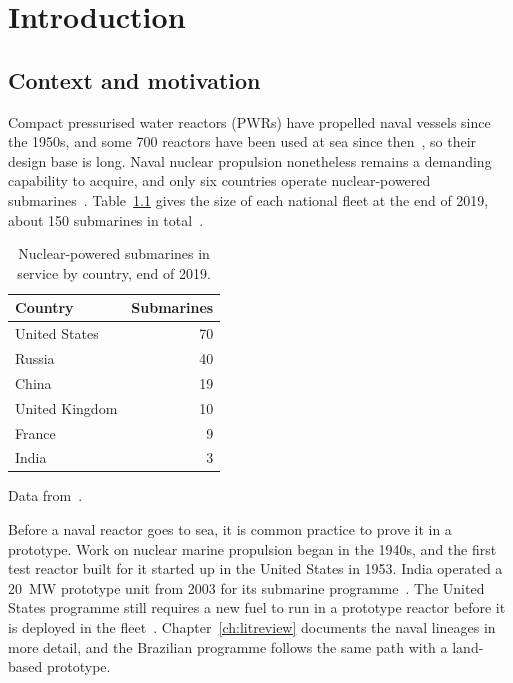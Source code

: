 \providecommand{\openpoint}[1]{\par\noindent\fbox{\parbox{0.97\linewidth}{%
  \textbf{Open point:} #1}}\par}

\chapter{Introduction}
\label{ch:introduction}

\section{Context and motivation}
\label{sec:intro-context}

Compact pressurised water reactors (PWRs) have propelled naval vessels
since the 1950s, and some 700 reactors have been used at sea since
then~\cite{wna_ships}, so their design base is long. Naval nuclear
propulsion nonetheless remains a demanding capability to acquire, and
only six countries operate nuclear-powered submarines~\cite{wna_ships}.
Table~\ref{tab:intro-submarines} gives the size of each national fleet at
the end of 2019, about 150 submarines in total~\cite{wna_ships}.

\begin{table}[!htbp]
  \centering
  \caption{Nuclear-powered submarines in service by country, end of 2019.}
  \label{tab:intro-submarines}
  \small
  \begin{tabular}{@{}lr@{}}
    \toprule
    Country & Submarines \\
    \midrule
    United States  & 70 \\
    Russia         & 40 \\
    China          & 19 \\
    United Kingdom & 10 \\
    France         & 9  \\
    India          & 3  \\
    \bottomrule
  \end{tabular}

  \vspace{2pt}
  {\footnotesize Data from~\cite{wna_ships}.}
\end{table}
\FloatBarrier

Before a naval reactor goes to sea, it is common practice to prove it in
a prototype. Work on nuclear marine propulsion began in the 1940s, and
the first test reactor built for it started up in the United States in
1953. India operated a 20~MW prototype unit from 2003 for its
submarine programme~\cite{wna_ships}. The United States programme
still requires a new fuel to run in a prototype reactor before it is
deployed in the fleet~\cite{jason_2016}. Chapter~\ref{ch:litreview}
documents the naval lineages in more detail, and the Brazilian programme
follows the same path with a land-based prototype.

